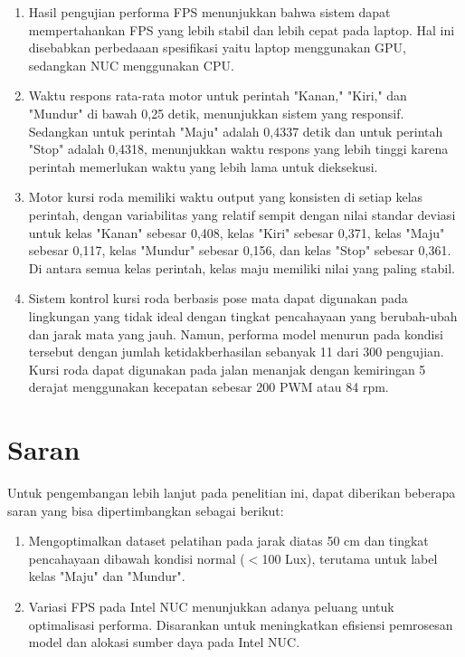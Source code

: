 \begin{enumerate}[nolistsep]
  \item Hasil pengujian performa FPS menunjukkan bahwa sistem dapat mempertahankan FPS yang lebih stabil dan lebih cepat pada laptop. Hal ini disebabkan perbedaaan spesifikasi yaitu laptop menggunakan GPU, sedangkan NUC menggunakan CPU.

  \item Waktu respons rata-rata motor untuk perintah "Kanan," "Kiri," dan "Mundur" di bawah 0,25 detik, menunjukkan sistem yang responsif. Sedangkan untuk perintah "Maju" adalah 0,4337 detik dan untuk perintah "Stop" adalah 0,4318, menunjukkan waktu respons yang lebih tinggi karena perintah memerlukan waktu yang lebih lama untuk dieksekusi.
  
  \item Motor kursi roda memiliki waktu output yang konsisten di setiap kelas perintah, dengan variabilitas yang relatif sempit dengan nilai standar deviasi untuk kelas "Kanan" sebesar 0,408, kelas "Kiri" sebesar 0,371, kelas "Maju" sebesar 0,117, kelas "Mundur" sebesar 0,156, dan kelas "Stop" sebesar 0,361. Di antara semua kelas perintah, kelas maju memiliki nilai yang paling stabil.
  
  \item Sistem kontrol kursi roda berbasis pose mata dapat digunakan pada lingkungan yang tidak ideal dengan tingkat pencahayaan yang berubah-ubah dan jarak mata yang jauh. Namun, performa model menurun pada kondisi tersebut dengan jumlah ketidakberhasilan sebanyak 11 dari 300 pengujian. Kursi roda dapat digunakan pada jalan menanjak dengan kemiringan 5 derajat menggunakan kecepatan sebesar 200 PWM atau 84 rpm.

\end{enumerate}

\section{Saran}
\label{chap:saran}

Untuk pengembangan lebih lanjut pada penelitian ini, dapat diberikan beberapa saran yang bisa dipertimbangkan sebagai berikut:

\begin{enumerate}[nolistsep]

  \item Mengoptimalkan dataset pelatihan pada jarak diatas 50 cm dan tingkat pencahayaan dibawah kondisi normal ($<$100 Lux), terutama untuk label kelas "Maju" dan "Mundur".
  
  \item Variasi FPS pada Intel NUC menunjukkan adanya peluang untuk optimalisasi performa. Disarankan untuk meningkatkan efisiensi pemrosesan model dan alokasi sumber daya pada Intel NUC.

\end{enumerate} 